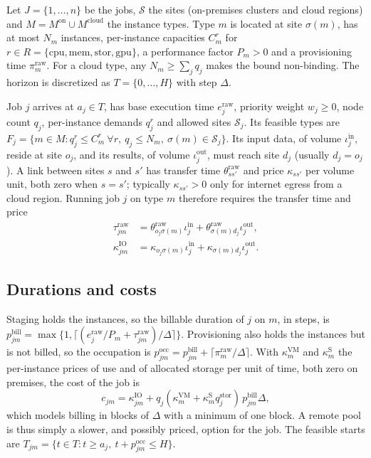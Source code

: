 \documentclass[conference]{IEEEtran}
\begin{document}
Let $J=\{1,\ldots,n\}$ be the jobs, $\mathcal{S}$ the sites (on-premises clusters and cloud regions) and $M=M^{\mathrm{on}}\cup M^{\mathrm{cloud}}$ the instance types. Type $m$ is located at site $\sigma(m)$, has at most $N_m$ instances, per-instance capacities $C_m^r$ for $r\in R=\{\mathrm{cpu},\mathrm{mem},\mathrm{stor},\mathrm{gpu}\}$, a performance factor $P_m>0$ and a provisioning time $\pi_m^{\mathrm{raw}}$. For a cloud type, any $N_m\geq\sum_j q_j$ makes the bound non-binding. The horizon is discretized as $T=\{0,\ldots,H\}$ with step $\Delta$.

Job $j$ arrives at $a_j\in T$, has base execution time $e_j^{\mathrm{raw}}$, priority weight $w_j\geq0$, node count $q_j$, per-instance demands $q_j^r$ and allowed sites $\mathcal{S}_j$. Its feasible types are $F_j=\{m\in M: q_j^r\leq C_m^r\ \forall r,\ q_j\leq N_m,\ \sigma(m)\in\mathcal{S}_j\}$. Its input data, of volume $\iota_j^{\mathrm{in}}$, reside at site $o_j$, and its results, of volume $\iota_j^{\mathrm{out}}$, must reach site $d_j$ (usually $d_j=o_j$). A link between sites $s$ and $s'$ has transfer time $\theta_{ss'}^{\mathrm{raw}}$ and price $\kappa_{ss'}$ per volume unit, both zero when $s=s'$; typically $\kappa_{ss'}>0$ only for internet egress from a cloud region. Running job $j$ on type $m$ therefore requires the transfer time and price
\begin{align}
 \tau_{jm}^{\mathrm{raw}}&=\theta_{o_j\sigma(m)}^{\mathrm{raw}}\iota_j^{\mathrm{in}}+\theta_{\sigma(m)d_j}^{\mathrm{raw}}\iota_j^{\mathrm{out}},\\
 \kappa_{jm}^{\mathrm{IO}}&=\kappa_{o_j\sigma(m)}\iota_j^{\mathrm{in}}+\kappa_{\sigma(m)d_j}\iota_j^{\mathrm{out}}.
\end{align}

\subsection{Durations and costs}

Staging holds the instances, so the billable duration of $j$ on $m$, in steps, is $p_{jm}^{\mathrm{bill}}=\max\{1,\lceil(e_j^{\mathrm{raw}}/P_m+\tau_{jm}^{\mathrm{raw}})/\Delta\rceil\}$. Provisioning also holds the instances but is not billed, so the occupation is $p_{jm}^{\mathrm{occ}}=p_{jm}^{\mathrm{bill}}+\lceil\pi_m^{\mathrm{raw}}/\Delta\rceil$. With $\kappa_m^{\mathrm{VM}}$ and $\kappa_m^{\mathrm{S}}$ the per-instance prices of use and of allocated storage per unit of time, both zero on premises, the cost of the job is
\begin{equation}
 c_{jm}=\kappa_{jm}^{\mathrm{IO}}+q_j(\kappa_m^{\mathrm{VM}}+\kappa_m^{\mathrm{S}}q_j^{\mathrm{stor}})\,p_{jm}^{\mathrm{bill}}\Delta,
\end{equation}
which models billing in blocks of $\Delta$ with a minimum of one block. A remote pool is thus simply a slower, and possibly priced, option for the job. The feasible starts are $T_{jm}=\{t\in T:t\geq a_j,\ t+p_{jm}^{\mathrm{occ}}\leq H\}$.
\end{document}
